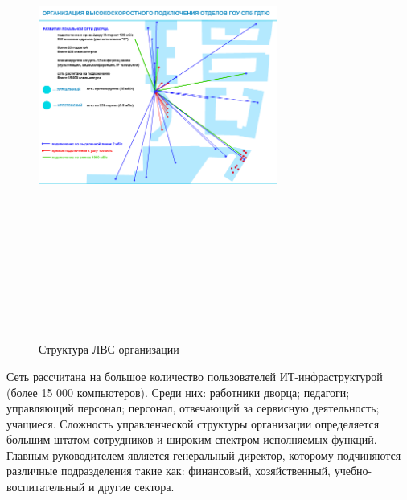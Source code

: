 \documentclass[utf8,usehyperref,12pt]{G7-32}
\begin{document}
\begin{figure}[ht]
   \centering%
   \includegraphics[height=160mm, width=0.7\textwidth, clip, keepaspectratio]{pictures/network}
   \caption{Структура ЛВС организации}\label{fig:fig_network}
 \end{figure}
 
 Сеть рассчитана на большое количество пользователей ИТ-инфраструктурой (более 15 000 компьютеров). Среди них: работники дворца; педагоги; управляющий персонал;  персонал, отвечающий за сервисную деятельность; учащиеся. Сложность управленческой структуры организации определяется большим штатом сотрудников и широким спектром исполняемых функций. Главным руководителем является генеральный директор, которому подчиняются различные подразделения такие как: финансовый, хозяйственный, учебно-воспитательный и другие сектора.
\end{document}
